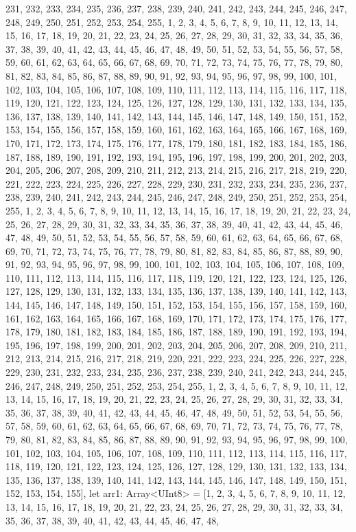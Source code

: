 231, 232, 233, 234, 235, 236, 237, 238, 239, 240, 241, 242, 243, 244, 245, 246, 247, 248, 249, 250, 251, 252, 253, 254, 255, 1, 2, 3, 4, 5, 6, 7, 8, 9, 10, 11, 12, 13, 14, 15, 16, 17, 18, 19, 20, 21, 22, 23, 24, 25, 26, 27, 28, 29, 30, 31, 32, 33, 34, 35, 36, 37, 38, 39, 40, 41, 42, 43, 44, 45, 46, 47, 48, 49, 50, 51, 52, 53, 54, 55, 56, 57, 58, 59, 60, 61, 62, 63, 64, 65, 66, 67, 68, 69, 70, 71, 72, 73, 74, 75, 76, 77, 78, 79, 80, 81, 82, 83, 84, 85, 86, 87, 88, 89, 90, 91, 92, 93, 94, 95, 96, 97, 98, 99, 100, 101, 102, 103, 104, 105, 106, 107, 108, 109, 110, 111, 112, 113, 114, 115, 116, 117, 118, 119, 120, 121, 122, 123, 124, 125, 126, 127, 128, 129, 130, 131, 132, 133, 134, 135, 136, 137, 138, 139, 140, 141, 142, 143, 144, 145, 146, 147, 148, 149, 150, 151, 152, 153, 154, 155, 156, 157, 158, 159, 160, 161, 162, 163, 164, 165, 166, 167, 168, 169, 170, 171, 172, 173, 174, 175, 176, 177, 178, 179, 180, 181, 182, 183, 184, 185, 186, 187, 188, 189, 190, 191, 192, 193, 194, 195, 196, 197, 198, 199, 200, 201, 202, 203, 204, 205, 206, 207, 208, 209, 210, 211, 212, 213, 214, 215, 216, 217, 218, 219, 220, 221, 222, 223, 224, 225, 226, 227, 228, 229, 230, 231, 232, 233, 234, 235, 236, 237, 238, 239, 240, 241, 242, 243, 244, 245, 246, 247, 248, 249, 250, 251, 252, 253, 254, 255, 1, 2, 3, 4, 5, 6, 7, 8, 9, 10, 11, 12, 13, 14, 15, 16, 17, 18, 19, 20, 21, 22, 23, 24, 25, 26, 27, 28, 29, 30, 31, 32, 33, 34, 35, 36, 37, 38, 39, 40, 41, 42, 43, 44, 45, 46, 47, 48, 49, 50, 51, 52, 53, 54, 55, 56, 57, 58, 59, 60, 61, 62, 63, 64, 65, 66, 67, 68, 69, 70, 71, 72, 73, 74, 75, 76, 77, 78, 79, 80, 81, 82, 83, 84, 85, 86, 87, 88, 89, 90, 91, 92, 93, 94, 95, 96, 97, 98, 99, 100, 101, 102, 103, 104, 105, 106, 107, 108, 109, 110, 111, 112, 113, 114, 115, 116, 117, 118, 119, 120, 121, 122, 123, 124, 125, 126, 127, 128, 129, 130, 131, 132, 133, 134, 135, 136, 137, 138, 139, 140, 141, 142, 143, 144, 145, 146, 147, 148, 149, 150, 151, 152, 153, 154, 155, 156, 157, 158, 159, 160, 161, 162, 163, 164, 165, 166, 167, 168, 169, 170, 171, 172, 173, 174, 175, 176, 177, 178, 179, 180, 181, 182, 183, 184, 185, 186, 187, 188, 189, 190, 191, 192, 193, 194, 195, 196, 197, 198, 199, 200, 201, 202, 203, 204, 205, 206, 207, 208, 209, 210, 211, 212, 213, 214, 215, 216, 217, 218, 219, 220, 221, 222, 223, 224, 225, 226, 227, 228, 229, 230, 231, 232, 233, 234, 235, 236, 237, 238, 239, 240, 241, 242, 243, 244, 245, 246, 247, 248, 249, 250, 251, 252, 253, 254, 255, 1, 2, 3, 4, 5, 6, 7, 8, 9, 10, 11, 12, 13, 14, 15, 16, 17, 18, 19, 20, 21, 22, 23, 24, 25, 26, 27, 28, 29, 30, 31, 32, 33, 34, 35, 36, 37, 38, 39, 40, 41, 42, 43, 44, 45, 46, 47, 48, 49, 50, 51, 52, 53, 54, 55, 56, 57, 58, 59, 60, 61, 62, 63, 64, 65, 66, 67, 68, 69, 70, 71, 72, 73, 74, 75, 76, 77, 78, 79, 80, 81, 82, 83, 84, 85, 86, 87, 88, 89, 90, 91, 92, 93, 94, 95, 96, 97, 98, 99, 100, 101, 102, 103, 104, 105, 106, 107, 108, 109, 110, 111, 112, 113, 114, 115, 116, 117, 118, 119, 120, 121, 122, 123, 124, 125, 126, 127, 128, 129, 130, 131, 132, 133, 134, 135, 136, 137, 138, 139, 140, 141, 142, 143, 144, 145, 146, 147, 148, 149, 150, 151, 152, 153, 154, 155], let arr1: Array<UInt8> = [1, 2, 3, 4, 5, 6, 7, 8, 9, 10, 11, 12, 13, 14, 15, 16, 17, 18, 19, 20, 21, 22, 23, 24, 25, 26, 27, 28, 29, 30, 31, 32, 33, 34, 35, 36, 37, 38, 39, 40, 41, 42, 43, 44, 45, 46, 47, 48, 